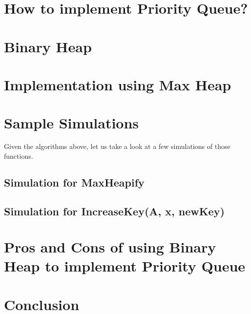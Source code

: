 \documentclass{report}
\begin{document}
\newpage
\section{How to implement Priority Queue?}


\newpage
\section{Binary Heap}


\newpage
\section{Implementation using Max Heap}


\newpage
\section{Sample Simulations}
Given the algorithms above, let us take a look at a few simulations of those functions.
\subsection{Simulation for Max\textunderscore Heapify}



\newpage

\subsection{Simulation for IncreaseKey(A, x, newKey)}


\newpage
\section{Pros and Cons of using Binary Heap to implement Priority Queue}


\newpage
\section{Conclusion}


\end{document}

